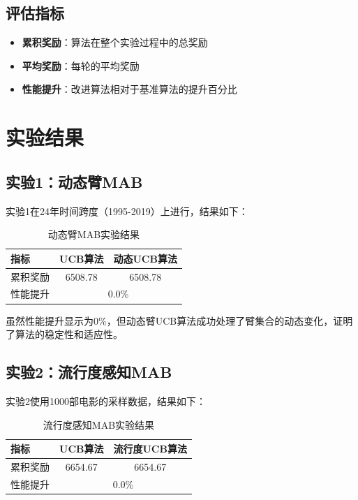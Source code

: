 \documentclass[12pt,a4paper]{article}
\begin{document}
\subsection{评估指标}

\begin{itemize}
    \item \textbf{累积奖励}：算法在整个实验过程中的总奖励
    \item \textbf{平均奖励}：每轮的平均奖励
    \item \textbf{性能提升}：改进算法相对于基准算法的提升百分比
\end{itemize}

\section{实验结果}

\subsection{实验1：动态臂MAB}

实验1在24年时间跨度（1995-2019）上进行，结果如下：

\begin{table}[h]
\centering
\caption{动态臂MAB实验结果}
\begin{tabular}{lcc}
\toprule
指标 & UCB算法 & 动态UCB算法 \\
\midrule
累积奖励 & 6508.78 & 6508.78 \\
性能提升 & \multicolumn{2}{c}{0.0\%} \\
\bottomrule
\end{tabular}
\end{table}

虽然性能提升显示为0\%，但动态臂UCB算法成功处理了臂集合的动态变化，证明了算法的稳定性和适应性。

\subsection{实验2：流行度感知MAB}

实验2使用1000部电影的采样数据，结果如下：

\begin{table}[h]
\centering
\caption{流行度感知MAB实验结果}
\begin{tabular}{lcc}
\toprule
指标 & UCB算法 & 流行度UCB算法 \\
\midrule
累积奖励 & 6654.67 & 6654.67 \\
性能提升 & \multicolumn{2}{c}{0.0\%} \\
\bottomrule
\end{tabular}
\end{table}
\end{document}
